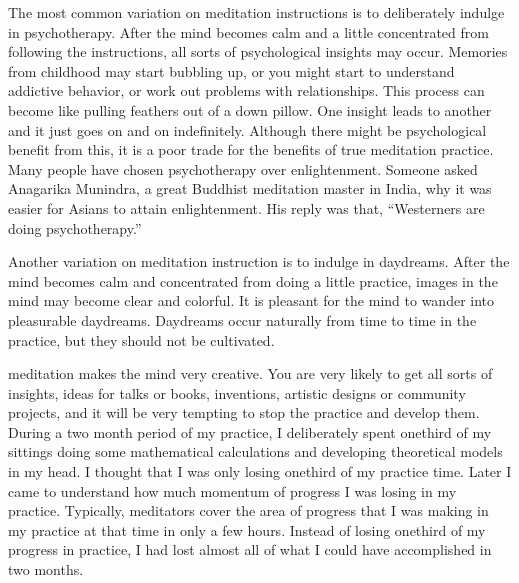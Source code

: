 \documentclass[a5paper,10pt,english]{book}
\begin{document}
\sphinxAtStartPar
The most common variation on meditation instructions is to
deliberately indulge in psychotherapy. After the mind becomes calm and a
little concentrated from following the instructions, all sorts of
psychological insights may occur. Memories from childhood may start
bubbling up, or you might start to understand addictive behavior, or
work out problems with relationships. This process can become like
pulling feathers out of a down pillow. One insight leads to another and
it just goes on and on indefinitely. Although there might be
psychological benefit from this, it is a poor trade for the benefits of
true meditation practice. Many people have chosen psychotherapy over
enlightenment. Someone asked Anagarika Munindra, a great Buddhist
meditation master in India, why it was easier for Asians to attain
enlightenment. His reply was that, “Westerners are doing psychotherapy.”

\sphinxAtStartPar
Another variation on meditation instruction is to indulge in daydreams.
After the mind becomes calm and concentrated from doing a little
practice, images in the mind may become clear and colorful. It is
pleasant for the mind to wander into pleasurable daydreams. Daydreams
occur naturally from time to time in the practice, but they should not
be cultivated.

\sphinxAtStartPar
{} meditation makes the mind very creative. You are very
likely to get all sorts of insights, ideas for talks or books,
inventions, artistic designs or community projects, and it will be very
tempting to stop the practice and develop them. During a two month
period of my practice, I deliberately spent one\sphinxhyphen{}third of my sittings
doing some mathematical calculations and developing theoretical models
in my head. I thought that I was only losing one\sphinxhyphen{}third of my practice
time. Later I came to understand how much momentum of progress I was
losing in my practice. Typically, meditators cover the area of progress
that I was making in my practice at that time in only a few hours.
Instead of losing one\sphinxhyphen{}third of my progress in practice, I had lost
almost all of what I could have accomplished in two months.
\end{document}
